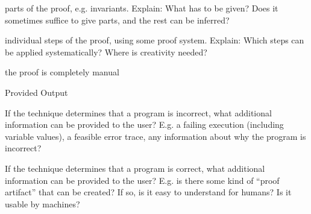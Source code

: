 \documentclass[a4paper]{article}
\begin{document}
\begin{minipage}[t]{0.16\linewidth}
\begin{betterlist}
\begin{betterlist}
			\item \checkboxUnchecked parts of the proof, e.g. invariants. Explain: What has to be given? Does it sometimes suffice to give parts, and the rest can be inferred?
			\item \checkboxUnchecked individual steps of the proof, using some proof system. Explain: Which steps can be applied systematically? Where is creativity needed?
			\item \checkboxUnchecked the proof is completely manual
		\end{betterlist}
		\item \alert{Provided Output}
		\begin{betterlist}
			\item If the technique determines that a program is incorrect, what additional information can be provided to the user? E.g. a failing execution (including variable values), a feasible error trace, any information about why the program is incorrect?

			\item If the technique determines that a program is correct, what additional information can be provided to the user? E.g. is there some kind of \enquote{proof artifact} that can be created? If so, is it easy to understand for humans? Is it usable by machines?


\end{betterlist}
\end{betterlist}
\end{minipage}
\end{document}
